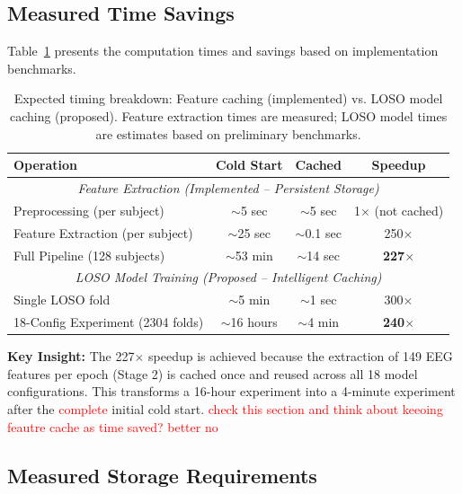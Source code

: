 \subsection{Measured Time Savings}

Table~\ref{tab:expected_time} presents the computation times and savings based on implementation benchmarks.

\begin{table}[ht]
\centering
\begin{tabular}{|l|c|c|c|}
\hline
\textbf{Operation} & \textbf{Cold Start} & \textbf{Cached} & \textbf{Speedup} \\
\hline
\multicolumn{4}{|c|}{\textit{Feature Extraction (Implemented -- Persistent Storage)}} \\
\hline
Preprocessing (per subject) & $\sim$5 sec & $\sim$5 sec & 1$\times$ (not cached) \\
\hline
Feature Extraction (per subject) & $\sim$25 sec & $\sim$0.1 sec & 250$\times$ \\
\hline
Full Pipeline (128 subjects) & $\sim$53 min & $\sim$14 sec & \textbf{227$\times$} \\
\hline
\multicolumn{4}{|c|}{\textit{LOSO Model Training (Proposed -- Intelligent Caching)}} \\
\hline
Single LOSO fold & $\sim$5 min & $\sim$1 sec & 300$\times$ \\
\hline
18-Config Experiment (2304 folds) & $\sim$16 hours & $\sim$4 min & \textbf{240$\times$} \\
\hline
\end{tabular}
\caption{Expected timing breakdown: Feature caching (implemented) vs. LOSO model caching (proposed). Feature extraction times are measured; LOSO model times are estimates based on preliminary benchmarks.}
\label{tab:expected_time}
\end{table}

\textbf{Key Insight:} The 227$\times$ speedup is achieved because the extraction of 149 EEG features per epoch (Stage 2) is cached once and reused across all 18 model configurations. This transforms a 16-hour experiment into a 4-minute experiment after the \textcolor{red}{complete} initial cold start. \textcolor{red}{check this section and think about keeoing feautre cache as time saved? better no}

\subsection{Measured Storage Requirements}


